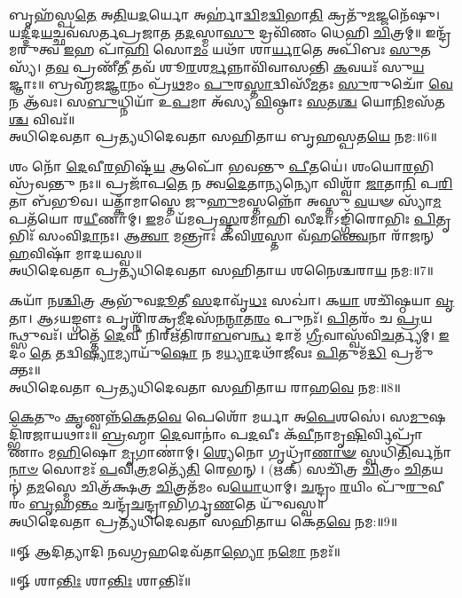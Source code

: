 𑌬𑍃𑌹᳴𑌸𑍍𑌪\-\ul{𑌤𑍇} 𑌅\-\ul{𑌤𑌿}\-𑌯\-\ul{𑌦}\-𑌰𑍍𑌯𑍋 𑌅𑌰𑍍𑌹𑌾॑\-\ul{𑌦𑍍𑌵𑌿}\-𑌮\-\ul{𑌦𑍍𑌵𑌿}\-𑌭𑌾\-\ul{𑌤𑌿} 𑌕𑍍𑌰𑌤𑍁᳴\-\ul{𑌮}\-𑌜𑍍𑌜𑌨𑍇᳴𑌷𑍁। 𑌯\-\ul{𑌦𑍍𑌦𑍀}\-𑌦\-\ul{𑌯}\-𑌚𑍍𑌛𑌵᳴𑌸𑌰𑍍𑌤\-𑌪𑍍𑌰𑌜𑌾\-\ul{𑌤} 𑌤\-\ul{𑌦}\-𑌸𑍍𑌮𑌾\-\ul{𑌸𑍁} 𑌦𑍍𑌰𑌵𑌿᳴𑌣𑌂 𑌧𑍇𑌹𑌿 \ul{𑌚𑌿}\-𑌤𑍍𑌰𑌮𑍍॥ 𑌇𑌨𑍍𑌦𑍍𑌰᳴𑌮𑌰𑍁𑌤𑍍𑌵 \ul{𑌇}\-𑌹 𑌪𑌾᳴\-\ul{𑌹𑌿} 𑌸𑍋\-\ul{𑌮𑌂} 𑌯𑌥𑌾᳴ 𑌶𑌾\-\ul{𑌰𑍍𑌯𑌾}\-𑌤𑍇 𑌅𑌪𑌿᳴𑌬𑌃 \ul{𑌸𑍁}\-𑌤𑌸𑍍𑌯᳴। 𑌤\-\ul{𑌵} 𑌪𑍍𑌰𑌣𑍀᳴\-\ul{𑌤𑍀} 𑌤𑌵᳴ 𑌶𑍂\-\ul{𑌰}\-𑌶\-\ul{𑌰𑍍𑌮}\-𑌨𑍍𑌨𑌾𑌵𑌿᳴𑌵𑌾𑌸𑌨𑍍𑌤𑌿 \ul{𑌕}\-𑌵𑌯𑌃᳴ 𑌸𑍁\-\ul{𑌯}\-𑌜𑍍𑌞𑌾𑌃॥ 𑌬𑍍𑌰𑌹𑍍𑌮᳴𑌜\-\ul{𑌜𑍍𑌞𑌾}\-𑌨𑌂 𑌪𑍍𑌰᳴\-\ul{𑌥}\-𑌮𑌂 \ul{𑌪𑍁}\-𑌰\-\ul{𑌸𑍍𑌤𑌾}\-𑌦𑍍𑌵𑌿𑌸𑍀᳴\-\ul{𑌮}\-𑌤𑌃 \ul{𑌸𑍁}\-𑌰𑍁𑌚𑍋᳴ \ul{𑌵𑍇}\-𑌨 𑌆᳴𑌵𑌃। 𑌸\-\ul{𑌬𑍁}\-𑌧𑍍𑌨𑌿𑌯𑌾᳴ 𑌉\-\ul{𑌪}\-𑌮𑌾 𑌅᳴𑌸𑍍𑌯 \ul{𑌵𑌿}\-𑌷𑍍𑌠𑌾𑌃 \ul{𑌸}\-𑌤\-\ul{𑌶𑍍𑌚} 𑌯𑍋\-\ul{𑌨𑌿}\-𑌮𑌸᳴𑌤\-\ul{𑌶𑍍𑌚} 𑌵𑌿𑌵𑌃᳴॥\\
𑌅𑌧𑌿𑌦𑍇𑌵𑌤𑌾 𑌪𑍍𑌰𑌤𑍍𑌯𑌧𑌿𑌦𑍇𑌵𑌤𑌾 𑌸𑌹𑌿𑌤𑌾𑌯 𑌬𑍃𑌹𑌸𑍍𑌪𑌤\-\ul{𑌯𑍇} 𑌨𑌮:॥6॥ 

𑌶𑌂 𑌨𑍋᳴ \ul{𑌦𑍇}\-𑌵𑍀\-\ul{𑌰}\-𑌭𑌿𑌷𑍍𑌟᳴\-\ul{𑌯} 𑌆𑌪𑍋᳴ 𑌭𑌵𑌨𑍍𑌤𑍁 \ul{𑌪𑍀}\-𑌤𑌯𑍇॑। 𑌶𑌂𑌯𑍋\-\ul{𑌰}\-𑌭𑌿𑌸𑍍𑌰᳴𑌵𑌨𑍍𑌤𑍁 𑌨𑌃॥ 𑌪𑍍𑌰𑌜𑌾᳴𑌪\-\ul{𑌤𑍇} 𑌨 𑌤𑍍𑌵\-\ul{𑌦𑍇}\-𑌤𑌾\-\ul{𑌨𑍍𑌯}\-𑌨𑍍𑌯𑍋 𑌵𑌿𑌶𑍍𑌵𑌾᳴ \ul{𑌜𑌾}\-𑌤𑌾\-\ul{𑌨𑌿} 𑌪\-\ul{𑌰𑌿}\-𑌤𑌾 𑌬᳴𑌭𑍂𑌵। 𑌯𑌤𑍍𑌕𑌾᳴𑌮𑌾𑌸𑍍𑌤𑍇 𑌜𑍁\-\ul{𑌹𑍁}\-𑌮𑌸𑍍𑌤𑌨𑍍𑌨𑍋᳴ 𑌅𑌸𑍍𑌤𑍁 \ul{𑌵}\-𑌯𑍟 𑌸𑍍𑌯𑌾᳴\-\ul{𑌮} 𑌪𑌤᳴𑌯𑍋 𑌰\-\ul{𑌯𑍀}\-𑌣𑌾𑌮𑍍। \ul{𑌇}\-𑌮𑌂 𑌯᳴𑌮𑌪𑍍𑌰\-\ul{𑌸𑍍𑌤}\-𑌰𑌮𑌾𑌹𑌿 𑌸𑍀𑌦𑌾𑌽𑌙𑍍𑌗𑌿᳴𑌰𑍋𑌭𑌿𑌃 \ul{𑌪𑌿}\-𑌤𑍃𑌭𑌿𑌃᳴ 𑌸𑌂𑌵𑌿\-\ul{𑌦𑌾}\-𑌨𑌃। 𑌆\-\ul{𑌤𑍍𑌵𑌾} 𑌮𑌨𑍍𑌤𑍍𑌰𑌾𑌃॑ 𑌕𑌵𑌿\-\ul{𑌶}\-𑌸𑍍𑌤𑌾 𑌵᳴𑌹\-\ul{𑌨𑍍𑌤𑍍𑌵𑍇}\-𑌨𑌾 𑌰𑌾᳴𑌜𑌨𑍍 \ul{𑌹}\-𑌵𑌿𑌷𑌾᳴ 𑌮𑌾𑌦𑌯𑌸𑍍𑌵॥ \\
𑌅𑌧𑌿𑌦𑍇𑌵𑌤𑌾 𑌪𑍍𑌰𑌤𑍍𑌯𑌧𑌿𑌦𑍇𑌵𑌤𑌾 𑌸𑌹𑌿𑌤𑌾𑌯 𑌶𑌨𑍈𑌶𑍍𑌚𑌰𑌾\-\ul{𑌯} 𑌨𑌮:॥7॥ 

𑌕𑌯𑌾᳴ 𑌨\-\ul{𑌶𑍍𑌚𑌿}\-𑌤𑍍𑌰 𑌆𑌭𑍁᳴𑌵\-\ul{𑌦𑍂}\-𑌤𑍀 \ul{𑌸}\-𑌦𑌾𑌵𑍃᳴\-\ul{𑌧𑌃} 𑌸𑌖𑌾॑। 𑌕\-\ul{𑌯𑌾} 𑌶𑌚𑌿᳴𑌷𑍍𑌠𑌯𑌾 \ul{𑌵𑍃}\-𑌤𑌾। 𑌆𑌽𑌯𑌙𑍍𑌗𑍗𑌃 𑌪𑍃𑌶𑍍𑌨𑌿᳴𑌰𑌕𑍍𑌰\-\ul{𑌮𑍀}\-𑌦𑌸᳴𑌨\-\ul{𑌨𑍍𑌮𑌾}\-𑌤\-\ul{𑌰𑌂} 𑌪𑍁𑌨𑌃᳴। \ul{𑌪𑌿}\-𑌤𑌰𑌂᳴ 𑌚 \ul{𑌪𑍍𑌰}\-𑌯𑌨𑍍𑌥𑍍𑌸𑍁𑌵𑌃᳴। 𑌯𑌤𑍍𑌤𑍇᳴ \ul{𑌦𑍇}\-𑌵𑍀 𑌨𑌿𑌰𑍍𑌋᳴𑌤𑌿𑌰𑌾\-\ul{𑌬}\-𑌬\-\ul{𑌨𑍍𑌧} 𑌦𑌾𑌮᳴ \ul{𑌗𑍍𑌰𑍀}\-𑌵𑌾𑌸𑍍𑌵᳴𑌵𑌿\-\ul{𑌚}\-𑌰𑍍𑌤𑍍𑌯𑌮𑍍। \ul{𑌇}\-𑌦𑌂  \ul{𑌤𑍇} 𑌤𑌦𑍍𑌵𑌿\-\ul{𑌷𑍍𑌯𑌾}\-𑌮𑍍𑌯𑌾𑌯𑍁᳴\-\ul{𑌷𑍋} 𑌨 𑌮\-\ul{𑌧𑍍𑌯𑌾}\-𑌦𑌥𑌾᳴\-\ul{𑌜𑍀}\-𑌵𑌃 \ul{𑌪𑌿}\-𑌤𑍁𑌮᳴\-\ul{𑌦𑍍𑌧𑌿} 𑌪𑍍𑌰𑌮𑍁᳴𑌕𑍍𑌤𑌃॥ \\
𑌅𑌧𑌿𑌦𑍇𑌵𑌤𑌾 𑌪𑍍𑌰𑌤𑍍𑌯𑌧𑌿𑌦𑍇𑌵𑌤𑌾 𑌸𑌹𑌿𑌤𑌾𑌯 𑌰𑌾𑌹\-\ul{𑌵𑍇} 𑌨𑌮:॥8॥ 

\-\ul{𑌕𑍇}\-𑌤𑍁𑌂 \ul{𑌕𑍃}\-𑌣𑍍𑌵𑌨𑍍𑌨᳴\-\ul{𑌕𑍇}\-𑌤\-\ul{𑌵𑍇} 𑌪𑍇𑌶𑍋᳴ 𑌮𑌰𑍍𑌯𑌾 𑌅\-\ul{𑌪𑍇}\-𑌶𑌸𑍇॑। 𑌸\-\ul{𑌮𑍁}\-𑌷𑌦𑍍𑌭𑌿᳴𑌰𑌜𑌾𑌯𑌥𑌾𑌃॥ \ul{𑌬𑍍𑌰}\-𑌹𑍍𑌮𑌾 \ul{𑌦𑍇}\-𑌵𑌾𑌨𑌾𑌂॑ 𑌪\-\ul{𑌦}\-𑌵𑍀𑌃 𑌕᳴\-\ul{𑌵𑍀}\-𑌨𑌾𑌮𑍃\-\ul{𑌷𑌿}\-𑌰𑍍𑌵𑌿𑌪𑍍𑌰𑌾᳴𑌣𑌾𑌂 𑌮\-\ul{𑌹𑌿}\-𑌷𑍋 \ul{𑌮𑍃}\-𑌗𑌾𑌣𑌾॑𑌮𑍍। \ul{𑌶𑍍𑌯𑍇}\-𑌨𑍋 𑌗𑍃𑌧𑍍𑌰𑌾᳴\-\ul{𑌣𑌾}\-\-\ul{𑍟} 𑌸𑍍𑌵𑌧𑌿᳴\-\ul{𑌤𑌿}\-𑌰𑍍𑌵𑌨𑌾᳴\-\ul{𑌨𑌾}\-\-\ul{𑍞} 𑌸𑍋𑌮𑌃᳴ \ul{𑌪}\-𑌵𑌿\-\ul{𑌤𑍍𑌰}\-𑌮𑌤𑍍𑌯𑍇᳴\-\ul{𑌤𑌿} 𑌰𑍇𑌭𑌨𑍍। (𑌋𑌕𑍍) 𑌸𑌚𑌿᳴𑌤𑍍𑌰 \ul{𑌚𑌿}\-𑌤𑍍𑌰𑌂 \ul{𑌚𑌿}\-𑌤𑌯𑌨𑍍॑ 𑌤\-\ul{𑌮}\-𑌸𑍍𑌮𑍇 𑌚𑌿𑌤𑍍𑌰᳴𑌕𑍍𑌷𑌤𑍍𑌰 \ul{𑌚𑌿}\-𑌤𑍍𑌰𑌤᳴𑌮𑌂 𑌵\-\ul{𑌯𑍋}\-𑌧𑌾𑌮𑍍। \ul{𑌚}\-𑌨𑍍𑌦𑍍𑌰𑌂 \ul{𑌰}\-𑌯𑌿𑌂 𑌪𑍁᳴\-\ul{𑌰𑍁}\-𑌵𑍀𑌰𑌂॑ \ul{𑌬𑍃}\-𑌹\-\ul{𑌨𑍍𑌤𑌂} 𑌚𑌨𑍍𑌦𑍍𑌰᳴\-\ul{𑌚}\-𑌨𑍍𑌦𑍍𑌰𑌾𑌭𑌿᳴𑌰𑍍𑌗𑍃\-\ul{𑌣}\-𑌤𑍇 𑌯𑍁᳴𑌵𑌸𑍍𑌵॥ \\
𑌅𑌧𑌿𑌦𑍇𑌵𑌤𑌾 𑌪𑍍𑌰𑌤𑍍𑌯𑌧𑌿𑌦𑍇𑌵𑌤𑌾 𑌸𑌹𑌿𑌤𑌾𑌯 𑌕𑍇𑌤\-\ul{𑌵𑍇} 𑌨𑌮:॥9॥ 

\centerline{॥𑍐 𑌆𑌦𑌿𑌤𑍍𑌯𑌾𑌦𑌿 𑌨𑌵𑌗𑍍𑌰𑌹𑌦𑍇𑌵᳴𑌤𑌾\-\ul{𑌭𑍍𑌯𑍋} 𑌨\-\ul{𑌮𑍋} 𑌨𑌮𑌃᳴॥ }

\centerline{॥𑍐 𑌶𑌾\-\ul{𑌨𑍍𑌤𑌿𑌃} 𑌶𑌾\-\ul{𑌨𑍍𑌤𑌿𑌃} 𑌶𑌾𑌨𑍍𑌤𑌿𑌃᳴॥}
